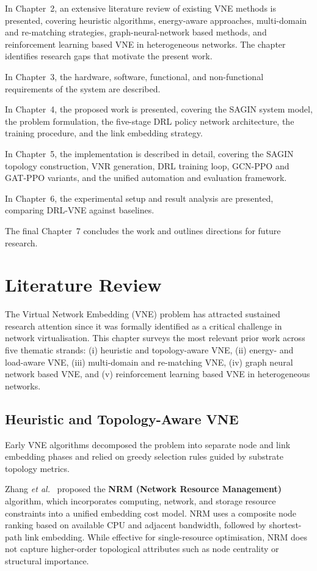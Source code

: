 \documentclass[12pt,a4paper]{report}
\begin{document}
In Chapter~2, an extensive literature review of existing VNE methods is presented, covering
heuristic algorithms, energy-aware approaches, multi-domain and re-matching strategies,
graph-neural-network based methods, and reinforcement learning based VNE in heterogeneous
networks. The chapter identifies research gaps that motivate the present work.

In Chapter~3, the hardware, software, functional, and non-functional requirements of the
system are described.

In Chapter~4, the proposed work is presented, covering the SAGIN system model, the problem
formulation, the five-stage DRL policy network architecture, the training procedure, and the
link embedding strategy.

In Chapter~5, the implementation is described in detail, covering the SAGIN topology
construction, VNR generation, DRL training loop, GCN-PPO and GAT-PPO variants, and the
unified automation and evaluation framework.

In Chapter~6, the experimental setup and result analysis are presented, comparing DRL-VNE
against baselines.

The final Chapter~7 concludes the work and outlines directions for future research.

\chapter{Literature Review}

The Virtual Network Embedding (VNE) problem has attracted sustained research attention since
it was formally identified as a critical challenge in network virtualisation. This chapter
surveys the most relevant prior work across five thematic strands: (i) heuristic and
topology-aware VNE, (ii) energy- and load-aware VNE, (iii) multi-domain and re-matching VNE,
(iv) graph neural network based VNE, and (v) reinforcement learning based VNE in heterogeneous
networks.

\section{Heuristic and Topology-Aware VNE}

Early VNE algorithms decomposed the problem into separate node and link embedding phases and
relied on greedy selection rules guided by substrate topology metrics.

Zhang \textit{et al.}\ \cite{zhang2017nrm} proposed the \textbf{NRM (Network Resource
Management)} algorithm, which incorporates computing, network, and storage resource constraints
into a unified embedding cost model. NRM uses a composite node ranking based on available CPU
and adjacent bandwidth, followed by shortest-path link embedding. While effective for
single-resource optimisation, NRM does not capture higher-order topological attributes such as
node centrality or structural importance.
\end{document}
